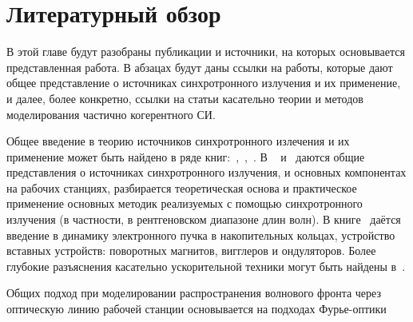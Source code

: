 \chapter*{Литературный обзор} \label{lit_rev}

В этой главе будут разобраны публикации и источники, на которых основывается представленная работа. В абзацах будут даны ссылки на работы, которые дают общее представление о источниках синхротронного излучения и их применение, и далее, более конкретно, ссылки на статьи касательно теории и методов моделирования частично когерентного СИ. 

Общее введение в теорию источников синхротронного излечения и их применение может быть найдено в ряде книг:~\cite{willmott_introduction_2019},~\cite{alsnielsen_elements_2011},~\cite{onuki_undulators_2003}. В ~\cite{willmott_introduction_2019} и~\cite{alsnielsen_elements_2011} даются общие представления о источниках синхротронного излучения, и основных компонентах на рабочих станциях, разбирается теоретическая основа и практическое применение основных методик реализуемых с помощью синхротронного излучения (в частности, в рентгеновском диапазоне длин волн). В книге~\cite{onuki_undulators_2003} даётся введение в динамику электронного пучка в накопительных кольцах, устройство вставных устройств: поворотных магнитов, вигглеров и ондуляторов. Более глубокие 
разъяснения касательно ускорительной техники могут быть найдены в~\cite{wiedemann_particle_2015}.

Общих подход при моделировании распространения волнового фронта через оптическую линию рабочей станции основывается на подходах Фурье-оптики~\cite{goodman_introduction_2005}

